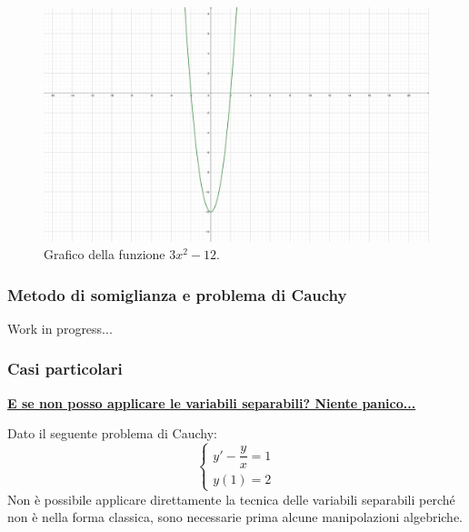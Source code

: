 \documentclass[a4paper]{article}
\newcommand{\example}[1]{\textcolor{Green4}{\textbf{#1}}}
\begin{document}
	\begin{figure}[!htp]
		\centering
		\includegraphics[width=.6\textwidth]{img/exercise/2023-06-21-A-ex1.pdf}
		\caption{Grafico della funzione $3x^{2}-12$.}
	\end{figure}

	\newpage

	\subsubsection{Metodo di somiglianza e problema di Cauchy}\label{subsubsection: metodo di somiglianza e problema di Cauchy}
	
	Work in progress...
	\newpage

	\subsubsection{Casi particolari}\label{subsubsection: casi particolari equazioni differenziali}

	\begin{flushleft}
		\example{\underline{E se non posso applicare le variabili separabili? Niente panico...}}
	\end{flushleft}

	\noindent
	Dato il seguente problema di Cauchy:
	\begin{equation*}
		\begin{cases}
			y' - \dfrac{y}{x} = 1 \\
			y\left(1\right) = 2
		\end{cases}
	\end{equation*}
	Non è possibile applicare direttamente la tecnica delle variabili separabili perché non è nella forma classica, sono necessarie prima alcune manipolazioni algebriche.\newline
\end{document}
